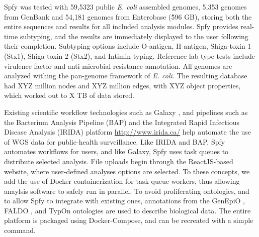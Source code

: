 \documentclass{article}
\begin{document}
Spfy was tested with 59,5323 public \textit{E. coli} assembled genomes, 5,353 genomes from GenBank and 54,181 genomes from Enterobase (\~596 GB), storing both the entire sequences and results for all included analysis modules.
Spfy provides real-time subtyping, and the results are immediately displayed to the user following their completion.
Subtyping options include O-antigen, H-antigen, Shiga-toxin 1 (Stx1), Shiga-toxin 2 (Stx2), and Intimin typing. Reference-lab type tests include virulence factor and anti-microbial resistance annotation. All genomes are analyzed withing the pan-genome framework of \textit{E. coli}.
The resulting database had XYZ million nodes and XYZ million edges, with XYZ object properties, which worked out to X TB of data stored. \para

Existing scientific workflow technologies such as Galaxy \cite{goecks2010galaxy}, and pipelines such as the Bacterium Analysis Pipeline (BAP) \cite{thomsen2016bacterial} and the Integrated Rapid Infectious Disease Analysis (IRIDA) platform \url{http://www.irida.ca/} help automate the use of WGS data for public-health surveillance.
Like IRIDA and BAP, Spfy automates workflows for users, and like Galaxy, Spfy uses task queues to distribute selected analysis. File uploads begin through the ReactJS-based website, where user-defined analyses options are selected. To these concepts, we add the use of Docker containerization for task queue workers, thus allowing anaylsis software to safely run in parallel.
To avoid proliferating ontologies, and to allow Spfy to integrate with existing ones, annotations from the GenEpiO \citep{griffiths2017context}, FALDO \citep{bolleman2016faldo}, and TypOn \citep{vaz2014typon} ontologies are used to describe biological data.
The entire platform is packaged using Docker-Compose, and can be recreated with a simple command. \para



\para
\end{document}
